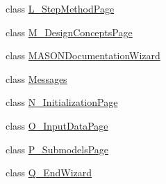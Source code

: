 \begin{DoxyCompactItemize}
\item 
class \hyperlink{classit_1_1isislab_1_1masonassisteddocumentation_1_1mason_1_1wizards_1_1_l___step_method_page}{L\-\_\-\-Step\-Method\-Page}
\item 
class \hyperlink{classit_1_1isislab_1_1masonassisteddocumentation_1_1mason_1_1wizards_1_1_m___design_concepts_page}{M\-\_\-\-Design\-Concepts\-Page}
\item 
class \hyperlink{classit_1_1isislab_1_1masonassisteddocumentation_1_1mason_1_1wizards_1_1_m_a_s_o_n_documentation_wizard}{M\-A\-S\-O\-N\-Documentation\-Wizard}
\item 
class \hyperlink{classit_1_1isislab_1_1masonassisteddocumentation_1_1mason_1_1wizards_1_1_messages}{Messages}
\item 
class \hyperlink{classit_1_1isislab_1_1masonassisteddocumentation_1_1mason_1_1wizards_1_1_n___initialization_page}{N\-\_\-\-Initialization\-Page}
\item 
class \hyperlink{classit_1_1isislab_1_1masonassisteddocumentation_1_1mason_1_1wizards_1_1_o___input_data_page}{O\-\_\-\-Input\-Data\-Page}
\item 
class \hyperlink{classit_1_1isislab_1_1masonassisteddocumentation_1_1mason_1_1wizards_1_1_p___submodels_page}{P\-\_\-\-Submodels\-Page}
\item 
class \hyperlink{classit_1_1isislab_1_1masonassisteddocumentation_1_1mason_1_1wizards_1_1_q___end_wizard}{Q\-\_\-\-End\-Wizard}
\end{DoxyCompactItemize}
